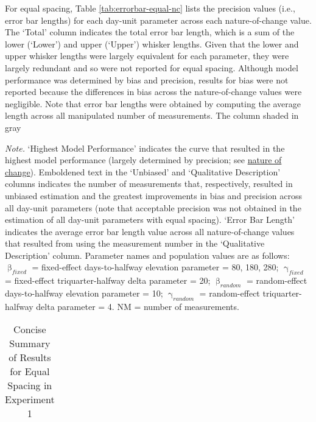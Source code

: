 \documentclass[
12pt, %
twoside,
english]{guelphthesis}
\begin{document}
For equal spacing, Table \ref{tab:errorbar-equal-nc} lists the precision values (i.e., error bar lengths) for each day-unit parameter across each nature-of-change value. The `Total' column indicates the total error bar length, which is a sum of the lower (`Lower') and upper (`Upper') whisker lengths. Given that the lower and upper whisker lengths were largely equivalent for each parameter, they were largely redundant and so were not reported for equal spacing. Although model performance was determined by bias and precision, results for bias were not reported because the differences in bias across the nature-of-change values were negligible. Note that error bar lengths were obtained by computing the average length across all manipulated number of measurements. The column shaded in gray

\begin{landscape}
\begin{ThreePartTable}
\begin{TableNotes}
\item \textit{Note. }`Highest Model Performance' indicates the curve that resulted in the highest model performance (largely determined by precision; see \hyperref[nature-change-equal-exp1]{nature of change}). Emboldened text in the `Unbiased' and `Qualitative Description' columns indicates the number of measurements that, respectively, resulted in unbiased estimation and the greatest improvements in bias and precision across all day-unit parameters (note that acceptable precision was not obtained in the estimation of all day-unit parameters with equal spacing). `Error Bar Length' indicates the average error bar length value across all nature-of-change values that resulted from using the measurement number in the `Qualitative Description' column. Parameter names and population values are as follows: $\upbeta_{fixed}$ = fixed-effect days-to-halfway elevation parameter = {80, 180, 280}; $\upgamma_{fixed}$ = fixed-effect triquarter-halfway delta parameter = 20; $\upbeta_{random}$ = random-effect days-to-halfway elevation parameter = 10; $\upgamma_{random}$ = random-effect triquarter-halfway delta parameter = 4. NM = number of measurements.
\end{TableNotes}
\begin{longtable}[l]{>{\raggedright\arraybackslash}p{2cm}>{\centering\arraybackslash}p{5cm}>{\centering\arraybackslash}p{2.5cm}>{\centering\arraybackslash}p{3cm}>{\raggedright\arraybackslash}p{6.5cm}>{\centering\arraybackslash}p{3cm}}
\caption{\label{tab:summary-table-equal-spacing-exp1}Concise Summary of Results for Equal Spacing in Experiment 1}\\

\end{longtable}
\end{ThreePartTable}
\end{landscape}
\end{document}
